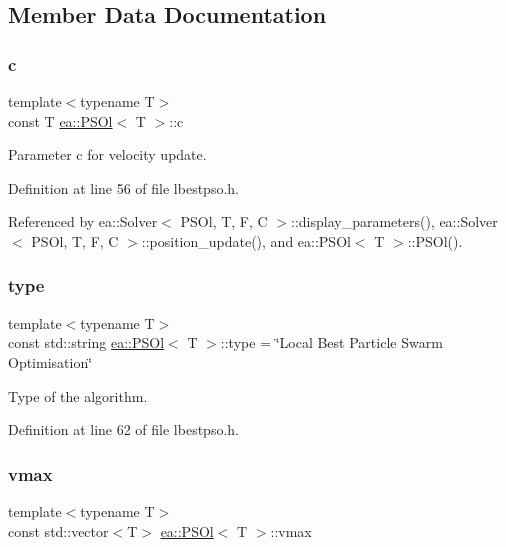 \subsection{Member Data Documentation}
\mbox{\label{structea_1_1_p_s_ol_a7be4dc6b98fb6b991a69ad1c2275fffa}} 
\subsubsection{\texorpdfstring{c}{c}}
{\footnotesize\ttfamily template$<$typename T$>$ \\
const T \hyperlink{structea_1_1_p_s_ol}{ea\+::\+P\+S\+Ol}$<$ T $>$\+::c}



Parameter c for velocity update. 



Definition at line 56 of file lbestpso.\+h.



Referenced by ea\+::\+Solver$<$ P\+S\+Ol, T, F, C $>$\+::display\+\_\+parameters(), ea\+::\+Solver$<$ P\+S\+Ol, T, F, C $>$\+::position\+\_\+update(), and ea\+::\+P\+S\+Ol$<$ T $>$\+::\+P\+S\+Ol().

\mbox{\label{structea_1_1_p_s_ol_ad45c22065d096770d48b1c9e99dfd4fc}} 
\subsubsection{\texorpdfstring{type}{type}}
{\footnotesize\ttfamily template$<$typename T$>$ \\
const std\+::string \hyperlink{structea_1_1_p_s_ol}{ea\+::\+P\+S\+Ol}$<$ T $>$\+::type = \char`\"{}Local Best Particle Swarm Optimisation\char`\"{}}



Type of the algorithm. 



Definition at line 62 of file lbestpso.\+h.

\mbox{\label{structea_1_1_p_s_ol_a426318723c134f47004407c3f3ab79ce}} 
\subsubsection{\texorpdfstring{vmax}{vmax}}
{\footnotesize\ttfamily template$<$typename T$>$ \\
const std\+::vector$<$T$>$ \hyperlink{structea_1_1_p_s_ol}{ea\+::\+P\+S\+Ol}$<$ T $>$\+::vmax}



